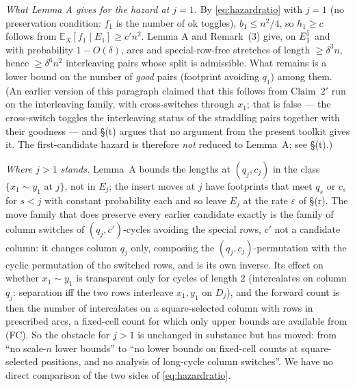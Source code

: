 \emph{What Lemma A gives for the hazard at $j=1$.}  By
\eqref{eq:hazardratio} with $j=1$ (no preservation condition: $f_1$ is
the number of ok toggles), $b_1\le n^2/4$, so $h_1\ge c$ follows from
$\mathbb E_X[f_1\mid E_1]\ge c'n^2$.  Lemma A and Remark~(3) give, on
$E_1^{\rm j}$ and with probability $1-O(\delta)$, arcs and
special-row-free stretches of length $\ge\delta^3n$, hence
$\ge\delta^6n^2$ interleaving pairs whose split is admissible.  What
remains is a lower bound on the number of \emph{good} pairs (footprint
avoiding $q_1$) among them.  (An earlier version of this paragraph
claimed that this follows from Claim~$2'$ run on the interleaving
family, with cross-switches through $x_1$; that is false --- the
cross-switch toggles the interleaving status of the straddling pairs
together with their goodness --- and \S(t) argues that no argument from
the present toolkit gives it.  The first-candidate hazard is therefore
\emph{not} reduced to Lemma~A; see \S(t).)

\emph{Where $j>1$ stands.}  Lemma~A bounds the lengths at $(q_j,c_j)$
in the class $\{x_1\sim y_1\text{ at }j\}$, not in $E_j$; the insert
moves at $j$ have footprints that meet $q_s$ or $c_s$ for $s<j$ with
constant probability each and so leave $E_j$ at the rate $\varepsilon$
of \S(r).  The move family that does preserve every earlier candidate
exactly is the family of column switches of $(q_j,c')$-cycles avoiding
the special rows, $c'$ not a candidate column: it changes column
$q_j$ only, composing the $(q_j,c_j)$-permutation with the cyclic
permutation of the switched rows, and is its own inverse.  Its effect
on whether $x_1\sim y_1$ is transparent only for cycles of length $2$
(intercalates on column $q_j$: separation iff the two rows interleave
$x_1,y_1$ on $D_j$), and the forward count is then the number of
intercalates on a square-selected column with rows in prescribed
arcs, a fixed-cell count for which only upper bounds are available
from (FC).  So the obstacle for $j>1$ is unchanged in substance but
has moved: from ``no scale-$n$ lower bounds'' to ``no lower bounds on
fixed-cell counts at square-selected positions, and no analysis of
long-cycle column switches''.  We have no direct comparison of the two
sides of \eqref{eq:hazardratio}.

